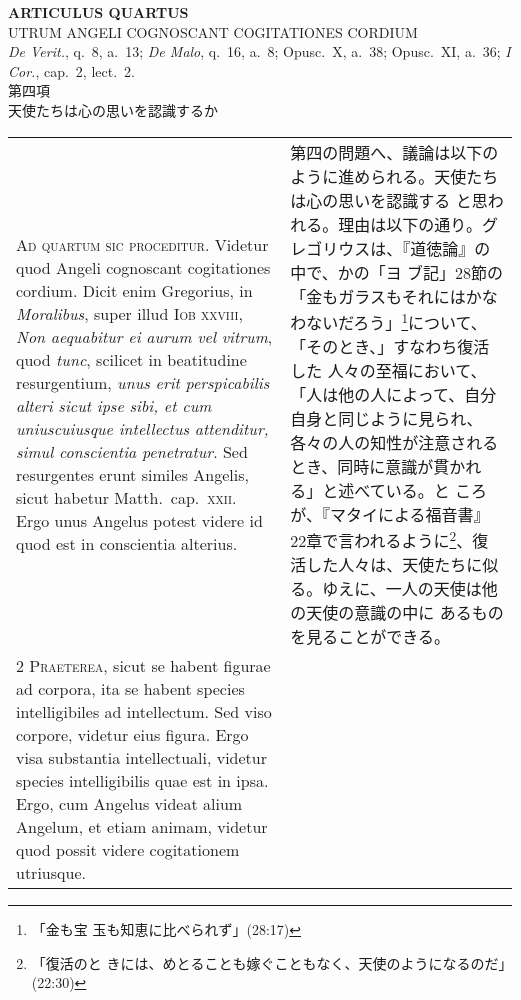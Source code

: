 \documentclass[10pt]{jsarticle} %
\begin{document}
\begin{center}
 {\Large {\bf ARTICULUS QUARTUS}}\\
 {\large UTRUM ANGELI COGNOSCANT COGITATIONES CORDIUM}\\
 {\footnotesize {\itshape De Verit.}, q.~8, a.~13; {\itshape De Malo},
 q.~16, a.~8; Opusc.~X, a.~38; Opusc.~XI, a.~36; {\itshape I Cor.},
 cap.~2, lect.~2.}\\
 {\Large 第四項\\天使たちは心の思いを認識するか}
\end{center}

\begin{longtable}{p{21em}p{21em}}

{\huge A}{\scshape d quartum sic proceditur}. Videtur quod
 Angeli cognoscant cogitationes cordium. Dicit enim Gregorius, in
 {\itshape Moralibus}, super illud {\scshape Iob} {\scshape xxviii}, {\itshape Non aequabitur ei aurum vel vitrum},
 quod {\itshape tunc}, scilicet in beatitudine resurgentium, {\itshape unus erit
 perspicabilis alteri sicut ipse sibi, et cum uniuscuiusque intellectus
 attenditur, simul conscientia penetratur}. Sed resurgentes erunt similes
 Angelis, sicut habetur Matth.~cap.~{\scshape xxii}. Ergo unus Angelus potest videre id
 quod est in conscientia alterius.

 
&

第四の問題へ、議論は以下のように進められる。天使たちは心の思いを認識する
と思われる。理由は以下の通り。グレゴリウスは、『道徳論』の中で、かの「ヨ
 ブ記」28節の「金もガラスもそれにはかなわないだろう」\footnote{「金も宝
 玉も知恵に比べられず」(28:17)}について、「そのとき、」すなわち復活した
 人々の至福において、「人は他の人によって、自分自身と同じように見られ、
 各々の人の知性が注意されるとき、同時に意識が貫かれる」と述べている。と
 ころが、『マタイによる福音書』22章で言われるように\footnote{「復活のと
 きには、めとることも嫁ぐこともなく、天使のようになるのだ」(22:30)}、復
 活した人々は、天使たちに似る。ゆえに、一人の天使は他の天使の意識の中に
 あるものを見ることができる。


\\



{\scshape 2 Praeterea}, sicut se habent figurae ad
 corpora, ita se habent species intelligibiles ad intellectum. Sed viso
 corpore, videtur eius figura. Ergo visa substantia intellectuali,
 videtur species intelligibilis quae est in ipsa. Ergo, cum Angelus
 videat alium Angelum, et etiam animam, videtur quod possit videre
 cogitationem utriusque.


\end{longtable}
\end{document}
